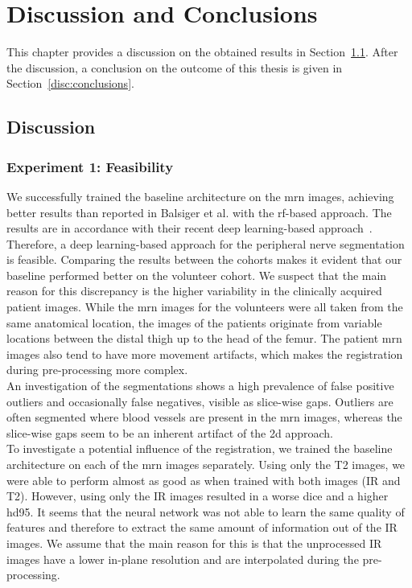 \chapter{Discussion and Conclusions} \label{chap:discussion_and_conclusions}
This chapter provides a discussion on the obtained results in Section~\ref{disc:discussion}. After the discussion, a conclusion on the outcome of this thesis is given in Section~\ref{disc:conclusions}.

\section{Discussion} \label{disc:discussion}
\subsection{Experiment 1: Feasibility}
We successfully trained the baseline architecture on the \gls{mrn} images, achieving better results than reported in Balsiger et al. \cite{Balsiger2016DevelopmentApproaches} with the \gls{rf}-based approach. The results are in accordance with their recent deep learning-based approach~\cite{Balsiger2018SegmentationApproach}. Therefore, a deep learning-based approach for the peripheral nerve segmentation is feasible. 
Comparing the results between the cohorts makes it evident that our baseline performed better on the volunteer cohort. We suspect that the main reason for this discrepancy is the higher variability in the clinically acquired patient images. While the \gls{mrn} images for the volunteers were all taken from the same anatomical location, the images of the patients originate from variable locations between the distal thigh up to the head of the femur. The patient \gls{mrn} images also tend to have more movement artifacts, which makes the registration during pre-processing more complex.\\
An investigation of the segmentations shows a high prevalence of false positive outliers and occasionally false negatives, visible as slice-wise gaps. Outliers are often segmented where blood vessels are present in the \gls{mrn} images, whereas the slice-wise gaps seem to be an inherent artifact of the \gls{2d} approach.\\
To investigate a potential influence of the registration, we trained the baseline architecture on each of the \gls{mrn} images separately. Using only the T2 images, we were able to perform almost as good as when trained with both images (IR and T2). However, using only the IR images resulted in a worse \acrlong{dice} and a higher \acrlong{hd95}. It seems that the neural network was not able to learn the same quality of features and therefore to extract the same amount of information out of the IR images. We assume that the main reason for this is that the unprocessed IR images have a lower in-plane resolution and are interpolated during the pre-processing.
